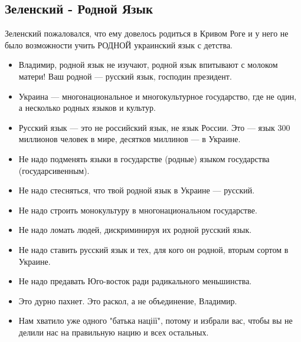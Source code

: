  
 
 

\subsection{Зеленский - Родной Язык}

Зеленский пожаловался, что ему довелось родиться в Кривом Роге и у него не было возможности учить РОДНОЙ украинский язык с детства. 

\begin{itemize}
  \item Владимир, родной язык не изучают, родной язык впитывают с молоком матери! Ваш родной — русский язык, господин президент. 
  \item Украина — многонациональное и многокультурное государство, где не один, а несколько родных языков и культур. 
  \item Русский язык — это не российский язык, не язык России. Это — язык 300 миллионов человек в мире, десятков миллинов — в Украине. 
  \item Не надо подменять языки в государстве (родные) языком государства (государсивенным). 
  \item Не надо стесняться, что твой родной язык в Украине — русский. 
  \item Не надо строить монокультуру в многонациональном государстве. 
  \item Не надо ломать людей, дискриминируя их родной русский язык. 
  \item Не надо ставить русский язык и тех, для кого он родной, вторым сортом в Украине. 
  \item Не надо предавать Юго-восток ради радикального меньшинства.
  \item Это дурно пахнет. Это раскол, а не объединение, Владимир. 
  \item Нам хватило уже одного "батька націії", потому и избрали вас, чтобы вы не делили нас на правильную нацию и всех остальных.
\end{itemize}
